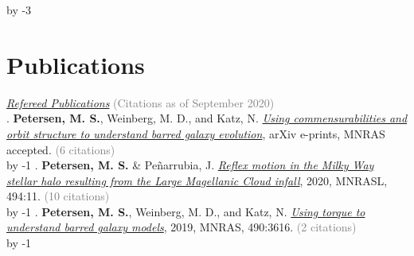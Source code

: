 

\newcount\TotalPublications
{}

\ifselectedpublications \advance\TotalPublications by -3\relax \fi

\newcount\PublicationsInReview
{}


\section{\sc \textcolor{redshade}{Publications} }
 \underline{\sl Refereed Publications} \ifcitationnumbers  \textcolor{grey}{(Citations as of September 2020)} \fi \\
\the\TotalPublications.  {\bf \textcolor{blueshade}{Petersen, M. S.}}, Weinberg, M. D., and Katz, N. \href{https://ui.adsabs.harvard.edu/abs/2019arXiv190205081P/abstract}{\it Using commensurabilities and orbit structure to understand barred galaxy evolution}, arXiv e-prints, MNRAS accepted. \ifcitationnumbers \textcolor{grey}{(6 citations)} \fi\\
\advance\TotalPublications by -1\relax
\the\TotalPublications.  {\bf \textcolor{blueshade}{Petersen, M. S.}} \& Pe{\~n}arrubia, J. \href{https://ui.adsabs.harvard.edu/abs/2020MNRAS.494L..11P/abstract}{\it Reflex motion in the Milky Way stellar halo resulting from the Large Magellanic Cloud infall}, 2020, MNRASL, 494:11. \ifcitationnumbers \textcolor{grey}{(10 citations)} \fi\\
\advance\TotalPublications by -1\relax
\the\TotalPublications.   {\bf \textcolor{blueshade}{Petersen, M. S.}}, Weinberg, M. D., and Katz, N. \href{https://ui.adsabs.harvard.edu/abs/2019MNRAS.490.3616P/abstract}{\it Using torque to understand barred galaxy models}, 2019, MNRAS, 490:3616. \ifcitationnumbers \textcolor{grey}{(2 citations)} \fi\\
\advance\TotalPublications by -1\relax
